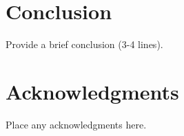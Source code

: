 \documentclass[balance,upint,subscriptcorrection,varvw,mathalfa=cal=boondoxo,pdf-a,colorlinks,nofoot]{asmeconf}
\begin{document}
\section{Conclusion}
\noindent Provide a brief conclusion (3-4 lines).

\section*{Acknowledgments}
\noindent Place any acknowledgments here.


\nocite{*}%


\end{document}
